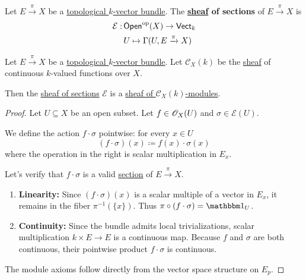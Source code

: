 \documentclass[../../../main]{subfiles}
\begin{document}
\begin{definition} \label{def:sheaf-of-sections-topological-vector-bundle}
  Let \(E \xrightarrow{\pi} X\) be a \hyperref[def:topological-vector-bundle]{topological \(k\)-vector bundle}.
  The \textbf{\hyperref[def:sheaf]{sheaf} of sections} of \(E \xrightarrow{\pi} X\) is
  \begin{align*}
    \mathcal{E}:\,& \mathsf{Open}^{\operatorname*{op}}(X) \to \mathsf{Vect}_{k} \\
        &U \mapsto \Gamma(U, E \xrightarrow{\pi} X)
  \end{align*}
\end{definition}

\begin{proposition} \label{prop:sheaf-of-sections-topological-vector-bundle-is-C-x-module}
  Let \(E \xrightarrow{\pi} X\) be a \hyperref[def:topological-vector-bundle]{topological \(k\)-vector bundle}.
  Let \(\mathcal{C}_{X}(k)\) be the \hyperref[def:sheaf]{sheaf} of continuous \(k\)-valued functions over \(X\).

  Then the \hyperref[def:sheaf-of-sections-topological-vector-bundle]{sheaf of sections} \(\mathcal{E}\) is a \hyperref[def:sheaf-of-modules]{sheaf of \(\mathcal{C}_{X}(k)\)-modules}.
\end{proposition}
\begin{proof}
  Let \(U \subseteq X\) be an open subset.
  Let \(f \in \mathscr{O}_{X}(U)\) and \(\sigma \in \mathcal{E}(U)\).
  
  We define the action \(f \cdot \sigma\) pointwise: for every \(x \in U\)
  \begin{equation*}
    (f \cdot \sigma)(x) \coloneq f(x) \cdot \sigma(x)
  \end{equation*}
  where the operation in the right is scalar multiplication in \(E_{x}\).

  Let's verify that \(f \cdot \sigma\) is a valid \hyperref[def:section-topological-vector-bundle]{section} of \(E \xrightarrow{\pi} X\).
  \begin{enumerate}
      \item \textbf{Linearity:} Since \((f \cdot \sigma)(x)\) is a scalar multiple of a vector in \(E_{x}\), it remains in the fiber \(\pi^{-1}(\{x\})\). Thus \(\pi \circ (f \cdot \sigma) = \id_{U}\).
      \item \textbf{Continuity:} Since the bundle admits local trivializations, scalar multiplication \(k \times E \to E\) is a continuous map. Because \(f\) and \(\sigma\) are both continuous, their pointwise product \(f \cdot \sigma\) is continuous.
  \end{enumerate}

  The module axioms follow directly from the vector space structure on \(E_{p}\).
\end{proof}
\end{document}

